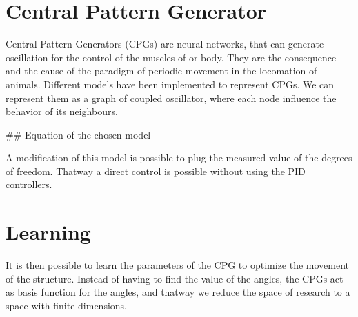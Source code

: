 \section{Central Pattern Generator}

Central Pattern Generators (CPGs) are neural networks, that can generate oscillation for the control of the muscles of or body. They are the consequence and the cause of the paradigm of periodic movement in the locomation of animals. Different models have been implemented to represent CPGs. We can represent them as a graph of coupled oscillator, where each node influence the behavior of its neighbours. 

## Equation of the chosen model

A modification of this model is possible to plug the measured value of the degrees of freedom. Thatway a direct control is possible without using the PID controllers. 

\section{Learning}

It is then possible to learn the parameters of the CPG to optimize the movement of the structure. Instead of having to find the value of the angles, the CPGs act as basis function for the angles, and thatway we reduce the space of research to a space with finite dimensions. 

